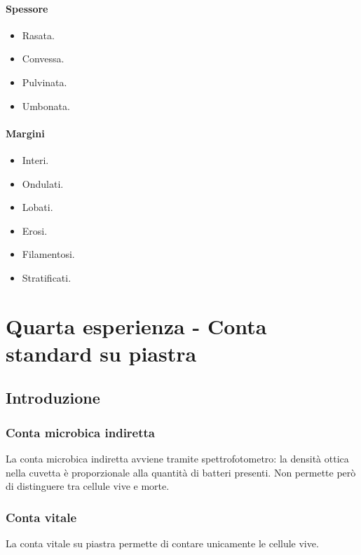 			\paragraph{Spessore}\mbox{}
			\begin{multicols}{2}
				\begin{itemize}
					\item Rasata.
					\item Convessa.
					\item Pulvinata.
					\item Umbonata.
				\end{itemize}
			\end{multicols}

			\paragraph{Margini}\mbox{}
			\begin{multicols}{3}
				\begin{itemize}
					\item Interi.
					\item Ondulati.
					\item Lobati.
					\item Erosi.
					\item Filamentosi.
					\item Stratificati.
				\end{itemize}
			\end{multicols}

\section{Quarta esperienza - Conta standard su piastra}

	\subsection{Introduzione}

		\subsubsection{Conta microbica indiretta}
		La conta microbica indiretta avviene tramite spettrofotometro: la densit\`a ottica nella cuvetta \`e proporzionale alla quantit\`a di batteri presenti.
		Non permette per\`o di distinguere tra cellule vive e morte.

		\subsubsection{Conta vitale}
		La conta vitale su piastra permette di contare unicamente le cellule vive.

